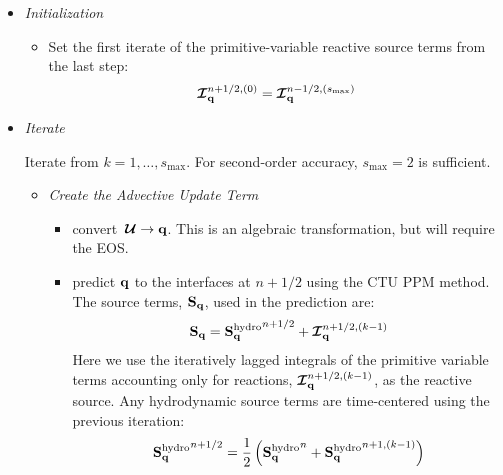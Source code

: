 \documentclass[times,modern]{aastex62}
\newcommand{\Ic}{{\boldsymbol{\mathcal{I}}}}
\newcommand{\smax}{{s_\mathrm{max}}}
\newcommand{\Uc}{{\,\bm{\mathcal{U}}}}
\newcommand{\Sq}{{\bf S}_\qb}
\newcommand{\Sqhydro}{{\Sq^{\mathrm{hydro}}}}
\newcommand{\qb}{{\bf q}}
\begin{document}
\begin{itemize}

\item {\em Initialization}

  \begin{itemize}
  \item Set the first iterate of the primitive-variable reactive source terms from the
    last step:
    \begin{equation}
      \Ic^{n+1/2,(0)}_{\qb} = \Ic^{n-1/2,(\smax)}_{\qb}
    \end{equation}


  \end{itemize}

\item {\em Iterate}

  Iterate from $k = 1, \ldots, \smax$.  For second-order accuracy,
  $\smax = 2$ is sufficient.

  \begin{itemize}
  \item {\em Create the Advective Update Term}

    \begin{itemize}
    \item convert $\Uc \rightarrow \qb$.  This is an algebraic transformation,
      but will require the EOS.

    \item predict $\qb$ to the interfaces at $n+1/2$ using the CTU PPM
      method.  The source terms, $\Sq$, used in the prediction are:
      \begin{equation}
        \Sq = \Sqhydro^{n+1/2} + \Ic_\qb^{n+1/2,(k-1)}
      \end{equation}
      Here we use the iteratively lagged integrals of the primitive variable
      terms accounting only for reactions, $\Ic_\qb^{n+1/2,(k-1)}$, as the
      reactive source.  Any hydrodynamic source terms are time-centered
      using the previous iteration:
      \begin{equation}
        \Sqhydro^{n+1/2} = \frac{1}{2} \left ( \Sqhydro^n + \Sqhydro^{n+1,(k-1)} \right )
      \end{equation}


\end{itemize}
\end{itemize}
\end{itemize}
\end{document}

